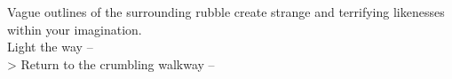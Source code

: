 Vague outlines of the surrounding rubble create strange and terrifying likenesses within your imagination.\\

 Light the way -- \\
> Return to the crumbling walkway -- 